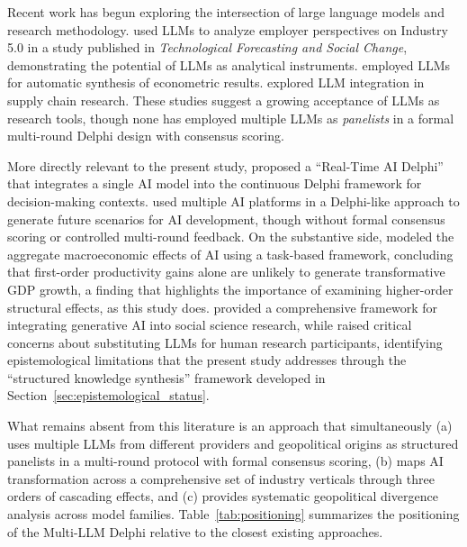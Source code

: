 \documentclass[preprint,review,12pt]{elsarticle}
\begin{document}
Recent work has begun exploring the intersection of large language models and research methodology. \citet{grybauskas2024llm} used LLMs to analyze employer perspectives on Industry 5.0 in a study published in \textit{Technological Forecasting and Social Change}, demonstrating the potential of LLMs as analytical instruments. \citet{guo2026llmsynthesis} employed LLMs for automatic synthesis of econometric results. \citet{liu2026llmsupplychain} explored LLM integration in supply chain research. These studies suggest a growing acceptance of LLMs as research tools, though none has employed multiple LLMs as \textit{panelists} in a formal multi-round Delphi design with consensus scoring.

More directly relevant to the present study, \citet{calleo2025rtaidelphi} proposed a ``Real-Time AI Delphi'' that integrates a single AI model into the continuous Delphi framework for decision-making contexts. \citet{mostashari2025aivisions} used multiple AI platforms in a Delphi-like approach to generate future scenarios for AI development, though without formal consensus scoring or controlled multi-round feedback. On the substantive side, \citet{acemoglu2024simplemacro} modeled the aggregate macroeconomic effects of AI using a task-based framework, concluding that first-order productivity gains alone are unlikely to generate transformative GDP growth, a finding that highlights the importance of examining higher-order structural effects, as this study does. \citet{bail2024genaisocialscience} provided a comprehensive framework for integrating generative AI into social science research, while \citet{crockett2024llmparticipants} raised critical concerns about substituting LLMs for human research participants, identifying epistemological limitations that the present study addresses through the ``structured knowledge synthesis'' framework developed in Section~\ref{sec:epistemological_status}.

What remains absent from this literature is an approach that simultaneously (a) uses multiple LLMs from different providers and geopolitical origins as structured panelists in a multi-round protocol with formal consensus scoring, (b) maps AI transformation across a comprehensive set of industry verticals through three orders of cascading effects, and (c) provides systematic geopolitical divergence analysis across model families. Table~\ref{tab:positioning} summarizes the positioning of the Multi-LLM Delphi relative to the closest existing approaches.
\end{document}

